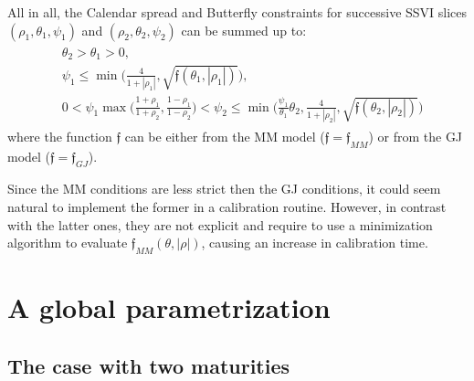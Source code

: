 \documentclass{article}
\begin{document}
	All in all, the Calendar spread and Butterfly constraints for successive
SSVI slices \((\rho_1,\theta_1,\psi_1)\) and
\((\rho_2,\theta_2,\psi_2)\) can be summed up to:
\begin{align}\label{eqArbitrages}
\begin{split}
& \theta_2>\theta_1>0,\\
& \psi_1 \leq \min\biggl(\frac{4}{1+|\rho_1|}, \sqrt{\mathfrak f(\theta_1,|\rho_1|)}\biggr),\\
& 0<\psi_1\max\biggl(\frac{1+\rho_1}{1+\rho_2},\frac{1-\rho_1}{1-\rho_2}\biggr)< \psi_2 \leq \min\biggl(\frac{\psi_1}{\theta_1}\theta_2, \frac{4}{1+|\rho_2|}, \sqrt{\mathfrak f(\theta_2,|\rho_2|)}\biggr)
\end{split}
\end{align} where the function \(\mathfrak f\) can be either from the MM
model (\(\mathfrak f=\mathfrak f_{MM}\)) or from the GJ model
(\(\mathfrak f=\mathfrak f_{GJ}\)).

Since the MM conditions are less strict then the GJ conditions, it could
seem natural to implement the former in a calibration routine. However,
in contrast with the latter ones, they are not explicit and require to
use a minimization algorithm to evaluate
\(\mathfrak f_{MM}(\theta,|\rho|)\), causing an increase in calibration
time.

	\hypertarget{a-global-parametrization}{%
\section{A global parametrization}\label{a-global-parametrization}}

	\hypertarget{the-case-with-two-maturities}{%
\subsection{The case with two
maturities}\label{the-case-with-two-maturities}}
\end{document}
